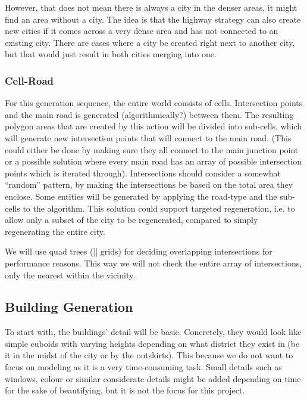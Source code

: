 However, that does not mean there is always a city in the denser areas, it might find an area without a city. The idea is that the highway strategy can also create new cities if it comes across
a very dense area and has not connected to an existing city. There are cases where a city be created right next to another city, but that would just result in both cities merging into one.


\subsubsection{Cell-Road}
For this generation sequence, the entire world consists of cells.
Intersection points and the main road is generated (algorithmically?) between them.
The resulting polygon areas that are created by this action will be divided into sub-cells, which will generate new intersection points that will connect to the main road. (This could either be done by making sure they all connect to the main junction point or a possible solution where every main road has an array of possible intersection points which is iterated through).
Intersections should consider a somewhat “random” pattern, by making the intersections be based on the total area they enclose.
Some entities will be generated by applying the road-type and the sub-cells to the algorithm.
This solution could support targeted regeneration, i.e. to allow only a subset of the city to be regenerated, compared to simply regenerating the entire city.

We will use quad trees (|| grids) for deciding overlapping intersections for performance reasons.
This way we will not check the entire array of intersections, only the nearest within the vicinity.

\subsection{Building Generation}
To start with, the buildings’ detail will be basic.
Concretely, they would look like simple cuboids with varying heights depending on what district they exist in (be it in the midst of the city or by the outskirts).
This because we do not want to focus on modeling as it is a very time-consuming task.
Small details such as windows, colour or similar considerate details might be added depending on time for the sake of beautifying, but it is not the focus for this project.
